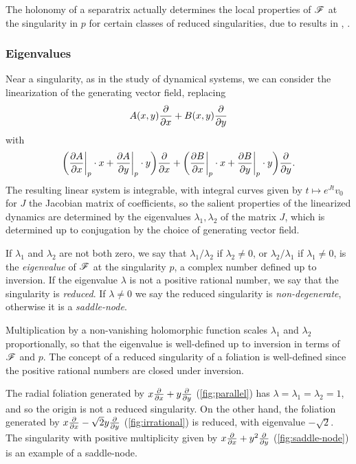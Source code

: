 The holonomy of a separatrix actually determines the local properties of $\mathscr{F}$
at the singularity in $p$ for certain classes of reduced singularities, due to
results in \cite{mattei_80}, \cite{martinet_82}.

\subsubsection{Eigenvalues}

Near a singularity, as in the study of dynamical systems, we can consider the
linearization of the generating vector field, replacing
\begin{equation*}
    A(x,y)\pdv{}{x} + B(x,y)\pdv{}{y}
\end{equation*}
with
\begin{equation*}
    \biggl(\pdv{A}{x}\bigg|_p\cdot x+\pdv{A}{y}\bigg|_p\cdot y\biggr)\pdv{}{x}
        + \biggl(\pdv{B}{x}\bigg|_p\cdot x+\pdv{B}{y}\bigg|_p\cdot y\biggr)
            \pdv{}{y}.
\end{equation*}
The resulting linear system is integrable, with integral curves given by
$t\mapsto e^{Jt}v_0$ for $J$ the Jacobian matrix of coefficients, so the salient
properties of the linearized dynamics are determined by the eigenvalues
$\lambda_1,\lambda_2$ of the matrix $J$, which is determined up to conjugation
by the choice of generating vector field.

\begin{definition}
    If $\lambda_1$ and $\lambda_2$ are not both zero, we say that
    $\lambda_1/\lambda_2$ if $\lambda_2\ne0$, or $\lambda_2/\lambda_1$ if
    $\lambda_1\ne0$, is the \emph{eigenvalue} of $\mathscr{F}$ at the singularity $p$,
    a complex number defined up to inversion. If the eigenvalue $\lambda$ is not
    a positive rational number, we say that the singularity is \emph{reduced}.
    If $\lambda\ne0$ we say the reduced singularity is \emph{non-degenerate},
    otherwise it is a \emph{saddle-node}.
\end{definition}

\begin{remark}
    Multiplication by a non-vanishing holomorphic function scales $\lambda_1$
    and $\lambda_2$ proportionally, so that the eigenvalue is well-defined up to
    inversion in terms of $\mathscr{F}$ and $p$. The concept of a reduced singularity
    of a foliation is well-defined since the positive rational numbers are
    closed under inversion.
\end{remark}

\begin{example}
    The radial foliation generated by $x\pdv{}{x}+y\pdv{}{y}$
    (\cref{fig:parallel}) has $\lambda=\lambda_1=\lambda_2=1$, and so the origin
    is not a reduced singularity. On the other hand, the foliation generated by
    $x\pdv{}{x}-\sqrt2y\pdv{}{y}$ (\cref{fig:irrational}) is reduced, with
    eigenvalue $-\sqrt2$. The singularity with positive multiplicity given
    by $x\pdv{}{x}+y^2\pdv{}{y}$ (\cref{fig:saddle-node}) is an example of a
    saddle-node.
\end{example}

